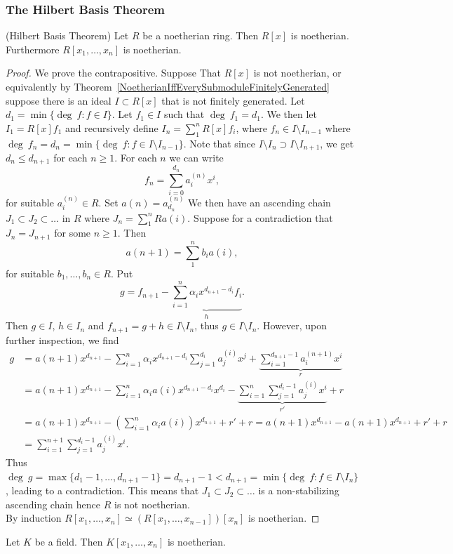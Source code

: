 \subsubsection{The Hilbert Basis Theorem}
\begin{theorem}(Hilbert Basis Theorem)\label{EveryPolynomialIdealIsFinitelyGenerated}
    Let $R$ be a noetherian ring. Then $R[x]$ is  noetherian. Furthermore $R[x_1,\dots,x_n]$ is noetherian. 
\end{theorem}
\begin{proof}
    We prove the contrapositive. Suppose That $R[x]$ is not noetherian, or equivalently by Theorem~\ref{NoetherianIffEverySubmoduleFinitelyGenerated} suppose there is an ideal $I\subset R[x]$ that is not finitely generated. Let $d_1 = \min\{\deg \ f : f \in I\}$. Let $f_1 \in I$ such that $\deg \ f_1 = d_1$. We then let $I_1 = R[x]f_1$ and recursively define $I_n = \sum_1^n R[x]f_i$, where $f_n \in I\setminus I_{n-1}$ where $\deg \ f_n = d_n = \min\{ \deg \ f: f \in I \setminus I_{n-1}\}$. Note that since $I\setminus I_n \supset I\setminus I_{n+1}$, we get $d_n\leq d_{n+1}$ for each $n\geq 1$. For each $n$ we can write 
    $$f_n = \sum_{i=0}^{d_n} a_i^{(n)}x^i,$$
    for suitable $a_i^{(n)}\in R$. Set $a(n) = a_{d_n}^{(n)}$
    We then have an ascending chain $J_1\subset J_2\subset\dots$ in $R$ where $J_n =\sum_1^n Ra(i)$.
    Suppose for a contradiction that $J_n = J_{n+1}$ for some $n\geq 1$. Then 
    $$a(n+1) = \sum_1^n b_ia(i),$$
    for suitable $b_1,\dots,b_n \in R.$ Put 
    $$g = f_{n+1} - \underbrace{\sum_{i=1}^n\alpha_i x^{d_{n+1}-d_i}f_i}_{h}.$$
    Then $g \in I$, $h\in I_n$ and $f_{n+1} = g + h\in I\setminus I_n$, thus $g \in I \setminus I_n$. However, upon further inspection, we find
    \begin{align*}
        g &= a(n+1)x^{d_{n+1}} -\sum_{i=1}^n\alpha_ix^{d_{n+1}-d_i}\sum_{j=1}^{d_i} a_j^{(i)} x^j + \underbrace{\sum_{i=1}^{d_{n+1}-1} a_i^{(n+1)}x^i}_{r}\\ 
        &= a(n+1)x^{d_{n+1}}-\sum_{i=1}^n\alpha_ia(i) x^{d_{n+1}-d_i}x^{d_i}-\underbrace{\sum_{i=1}^n\sum_{j=1}^{d_i-1} a_j^{(i)}x^i}_{r'} + r \\
        &= a(n+1)x^{d_{n+1}}-\left(\sum_{i=1}^n\alpha_ia(i) \right)x^{d_{n+1}}+r'+r =a(n+1)x^{d_{n+1}}-a(n+1)x^{d_{n+1}} +r'+r\\ &= \sum_{i=1}^{n+1}\sum_{j=1}^{d_i-1}a_j^{(i)}x^{i}.
    \end{align*}
    Thus $\deg \ g = \max\{d_1-1,\dots,d_{n+1}-1\} = d_{n+1}-1< d_{n+1} =\min\{ \deg \ f : f \in I\setminus I_n\}$, leading to a contradiction. This means that $J_1\subset J_2\subset \dots$ is a non-stabilizing ascending chain hence $R$ is not noetherian.\\
    By induction $R[x_1,\dots,x_n]\simeq \left(R[x_1,\dots,x_{n-1}]\right)[x_n]$ is noetherian.
\end{proof}
\begin{corollary}\label{PolynomialIdealOverFieldIsFinitelyGenerated}
    Let $K$ be a field. Then $K[x_1,\dots,x_n]$ is noetherian.
\end{corollary}
